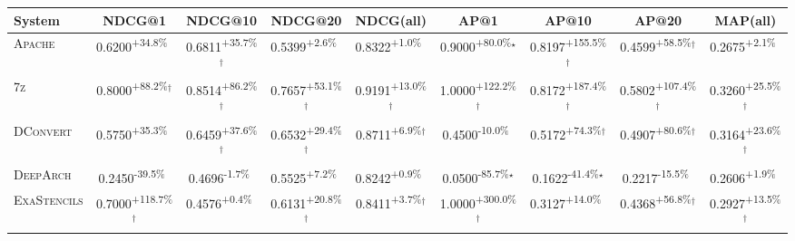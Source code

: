 \begin{table}[htbp]
\centering
\renewcommand{\arraystretch}{1.2}
\begin{tabular}{l|cccc|cccc}
\hline
System & NDCG@1 & NDCG@10 & NDCG@20 & NDCG(all) & AP@1 & AP@10 & AP@20 & MAP(all) \\ \hline
\textsc{Apache} & \cellcolor{green!30}0.6200\textsuperscript{+34.8\%}$^{\,\,\,}$ & \cellcolor{green!30}0.6811\textsuperscript{+35.7\%}$^\dagger$ & \cellcolor{green!30}0.5399\textsuperscript{+2.6\%}$^{\,\,\,}$ & \cellcolor{green!30}0.8322\textsuperscript{+1.0\%}$^{\,\,\,}$ & \cellcolor{green!30}0.9000\textsuperscript{+80.0\%}$^\star$ & \cellcolor{green!30}0.8197\textsuperscript{+155.5\%}$^\dagger$ & \cellcolor{green!30}0.4599\textsuperscript{+58.5\%}$^\dagger$ & \cellcolor{green!30}0.2675\textsuperscript{+2.1\%}$^{\,\,\,}$ \\
\textsc{7z} & \cellcolor{green!30}0.8000\textsuperscript{+88.2\%}$^\dagger$ & \cellcolor{green!30}0.8514\textsuperscript{+86.2\%}$^\dagger$ & \cellcolor{green!30}0.7657\textsuperscript{+53.1\%}$^\dagger$ & \cellcolor{green!30}0.9191\textsuperscript{+13.0\%}$^\dagger$ & \cellcolor{green!30}1.0000\textsuperscript{+122.2\%}$^\dagger$ & \cellcolor{green!30}0.8172\textsuperscript{+187.4\%}$^\dagger$ & \cellcolor{green!30}0.5802\textsuperscript{+107.4\%}$^\dagger$ & \cellcolor{green!30}0.3260\textsuperscript{+25.5\%}$^\dagger$ \\
\textsc{DConvert} & \cellcolor{green!30}0.5750\textsuperscript{+35.3\%}$^{\,\,\,}$ & \cellcolor{green!30}0.6459\textsuperscript{+37.6\%}$^\dagger$ & \cellcolor{green!30}0.6532\textsuperscript{+29.4\%}$^\dagger$ & \cellcolor{green!30}0.8711\textsuperscript{+6.9\%}$^\dagger$ & \cellcolor{red!30}0.4500\textsuperscript{-10.0\%}$^{\,\,\,}$ & \cellcolor{green!30}0.5172\textsuperscript{+74.3\%}$^\dagger$ & \cellcolor{green!30}0.4907\textsuperscript{+80.6\%}$^\dagger$ & \cellcolor{green!30}0.3164\textsuperscript{+23.6\%}$^\dagger$ \\
\textsc{DeepArch} & \cellcolor{red!30}0.2450\textsuperscript{-39.5\%}$^{\,\,\,}$ & \cellcolor{red!30}0.4696\textsuperscript{-1.7\%}$^{\,\,\,}$ & \cellcolor{green!30}0.5525\textsuperscript{+7.2\%}$^{\,\,\,}$ & \cellcolor{green!30}0.8242\textsuperscript{+0.9\%}$^{\,\,\,}$ & \cellcolor{red!30}0.0500\textsuperscript{-85.7\%}$^\star$ & \cellcolor{red!30}0.1622\textsuperscript{-41.4\%}$^\star$ & \cellcolor{red!30}0.2217\textsuperscript{-15.5\%}$^{\,\,\,}$ & \cellcolor{green!30}0.2606\textsuperscript{+1.9\%}$^{\,\,\,}$ \\
\textsc{ExaStencils} & \cellcolor{green!30}0.7000\textsuperscript{+118.7\%}$^\dagger$ & \cellcolor{green!30}0.4576\textsuperscript{+0.4\%}$^{\,\,\,}$ & \cellcolor{green!30}0.6131\textsuperscript{+20.8\%}$^\dagger$ & \cellcolor{green!30}0.8411\textsuperscript{+3.7\%}$^\dagger$ & \cellcolor{green!30}1.0000\textsuperscript{+300.0\%}$^\dagger$ & \cellcolor{green!30}0.3127\textsuperscript{+14.0\%}$^{\,\,\,}$ & \cellcolor{green!30}0.4368\textsuperscript{+56.8\%}$^\dagger$ & \cellcolor{green!30}0.2927\textsuperscript{+13.5\%}$^\dagger$ \\

\end{tabular}
\end{table}
